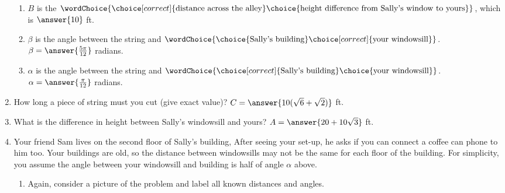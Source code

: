 \documentclass{ximera}
\begin{document}
\begin{exercise}
\begin{enumerate}
\begin{enumerate}
\item $B$ is the $\wordChoice{\choice[correct]{\text{distance across the alley}}\choice{\text{height difference from Sally's window to yours}}}$, which is $\answer{10}$ ft.

\item $\beta$ is the angle between the string and $\wordChoice{\choice{\text{Sally's building}}\choice[correct]{\text{your windowsill}}}$. \smallskip\\
$\beta = \answer{\frac{5\pi}{12}}$ radians.

\item $\alpha$ is the angle between the string and $\wordChoice{\choice[correct]{\text{Sally's building}}\choice{\text{your windowsill}}}$. \smallskip\\
$\alpha = \answer{\frac{\pi}{12}}$ radians.
\end{enumerate}

\item How long a piece of string must you cut (give exact value)? $C = \answer{10(\sqrt{6}+\sqrt{2})}$ ft.

\item What is the difference in height between Sally's windowsill and yours? $A = \answer{20+10\sqrt{3}}$ ft.

\item \begin{exercise}
Your friend Sam lives on the second floor of Sally's building, After seeing your set-up, he asks if you can connect a coffee can phone to him too. 
Your buildings are old, so the distance between windowsills may not be the same for each floor of the building. For simplicity, you assume the angle between your windowsill and building is half of angle $\alpha$ above.
%
\begin{enumerate}
\item Again, consider a picture of the problem and label all known distances and angles.
\begin{image}[2in]
		\end{image}


\end{enumerate}
\end{exercise}
\end{enumerate}
\end{exercise}
\end{document}
